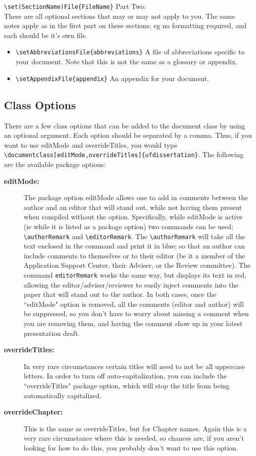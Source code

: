 \documentclass{article}
\begin{document}
        \verb|\set(SectionName)File{FileName}| Part Two:\\ These are all optional sections that may or may not apply to you. The same notes apply as in the first part on these sections; eg no formatting required, and each should be it's own file.
        \begin{itemize}
            \item \verb|\setAbbreviationsFile{abbreviations}| A file of abbreviations specific to your document. Note that this is not the same as a glossary or appendix.
            \item \verb|\setAppendixFile{appendix}| An appendix for your document.
        \end{itemize}
        
        

        
    \subsection{Class Options}\label{SubSec: Class Options}
        There are a few class options that can be added to the document class by using an optional argument. Each option should be separated by a comma. Thus, if you want to use editMode and overrideTitles, you would type \verb|\documentclass[editMode,overrideTitles]{ufdissertation}|. The following are the available package options:
        
        \begin{description}
            \item[\textbf{editMode:}] The package option editMode allows one to add in comments between the author and an editor that will stand out, while not having them present when compiled without the option. Specifically, while editMode is active (ie while it is listed as a package option) two commands can be used; \verb|\authorRemark| and \verb|\editorRemark|. The \verb|\authorRemark| will take all the text enclosed in the command and print it in blue; so that an author can include comments to themselves or to their editor (be it a member of the Application Support Center, their Adviser, or the Review committee). The command \verb|editorRemark| works the same way, but displays its text in red, allowing the editor/adviser/reviewer to easily inject comments into the paper that will stand out to the author. In both cases, once the ``editMode" option is removed, all the comments (editor and author) will be suppressed, so you don't have to worry about missing a comment when you are removing them, and having the comment show up in your latest presentation draft.
            \item[\textbf{overrideTitles:}] In very rare circumstances certain titles will need to not be all uppercase letters. In order to turn off auto-capitalization, you can include the ``overrideTitles" package option, which will stop the title from being automatically capitalized.
            \item[\textbf{overrideChapter:}] This is the same as overrideTitles, but for Chapter names. Again this is a very rare circumstance where this is needed, so chances are, if you aren't looking for how to do this, you probably don't want to use this option.
        \end{description}
        
\end{document}
